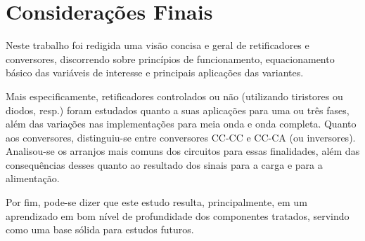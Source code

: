 \section{Considerações Finais}

Neste trabalho foi redigida uma visão concisa e geral de retificadores e conversores, discorrendo sobre princípios de funcionamento, equacionamento básico das variáveis de interesse e principais aplicações das variantes.

Mais especificamente, retificadores controlados ou não (utilizando tiristores ou diodos, resp.) foram estudados quanto a suas aplicações para uma ou três fases, além das variações nas implementações para meia onda e onda completa. Quanto aos conversores, distinguiu-se entre conversores CC-CC e CC-CA (ou inversores). Analisou-se os arranjos mais comuns dos circuitos para essas finalidades, além das consequências desses quanto ao resultado dos sinais para a carga e para a alimentação.

Por fim, pode-se dizer que este estudo resulta, principalmente, em um aprendizado em bom nível de profundidade dos componentes tratados, servindo como uma base sólida para estudos futuros.

